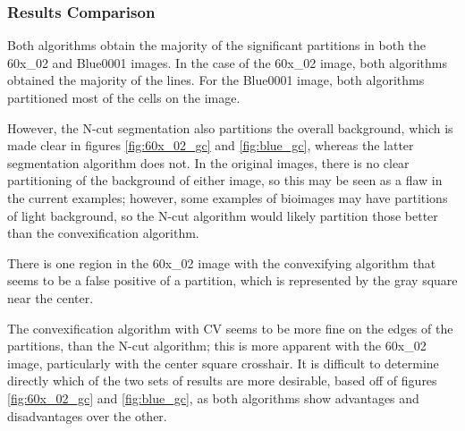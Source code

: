 \documentclass{article}
\begin{document}
\subsubsection*{Results Comparison}

Both algorithms obtain the majority of the significant partitions in both the 60x\_02 and Blue0001 images. In the case of the 60x\_02 image, both algorithms obtained the majority of the lines. For the Blue0001 image, both algorithms partitioned most of the cells on the image.

However, the N-cut segmentation also partitions the overall background, which is made clear in figures \ref{fig:60x_02_gc} and \ref{fig:blue_gc}, whereas the latter segmentation algorithm does not. In the original images, there is no clear partitioning of the background of either image, so this may be seen as a flaw in the current examples; however, some examples of bioimages may have partitions of light background, so the N-cut algorithm would likely partition those better than the convexification algorithm.

There is one region in the 60x\_02 image with the convexifying algorithm that seems to be a false positive of a partition, which is represented by the gray square near the center.

The convexification algorithm with CV seems to be more fine on the edges of the partitions, than the N-cut algorithm; this is more apparent with the 60x\_02 image, particularly with the center square crosshair. It is difficult to determine directly which of the two sets of results are more desirable, based off of figures \ref{fig:60x_02_gc} and \ref{fig:blue_gc}, as both algorithms show advantages and disadvantages over the other.






\pagebreak
\end{document}
